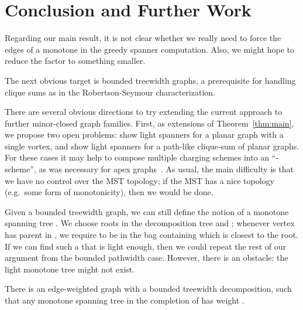 \documentclass{llncs}
\begin{document}
\section{Conclusion and Further Work}
\label{sec:further}

Regarding our main result, it is not clear whether we really need
to force the edges of a monotone  in the greedy spanner
computation.  Also, we might hope to reduce the  factor to
something smaller.  

The next obvious target is bounded treewidth graphs, a prerequisite
for handling clique sums as in the Robertson-Seymour characterization.


There are several obvious directions to try extending the current approach to
further minor-closed graph families.  First, as extensions of
Theorem~\ref{thm:main}, we propose two open problems: show light
spanners for a planar graph with a single vortex, and show light
spanners for a path-like clique-sum of planar graphs.  For these cases
it may help to compose multiple charging schemes into an
``-scheme'', as was necessary for apex
graphs~\cite{Grigni:2002:LSA:545381.545492}.  As usual, the main
difficulty is that we have no control over the MST topology; if the MST
has a nice topology (e.g.\ some form of monotonicity),
then we would be done.


Given a bounded treewidth graph, we can still define the notion of a
monotone spanning tree .
We choose roots in the decomposition tree and ; whenever vertex 
has parent  in , we require  to be in the bag containing  which
is closest to the root.
If we can find such a  that is light
enough, then we could repeat the rest of our argument from the bounded
pathwidth case.  However, there is an obstacle: the light monotone
tree might not exist.
\begin{theorem}\label{thm:nomono}
There is an edge-weighted graph  with a bounded treewidth decomposition,
such that any monotone spanning tree  in the completion of 
has weight .
\end{theorem}
\end{document}
